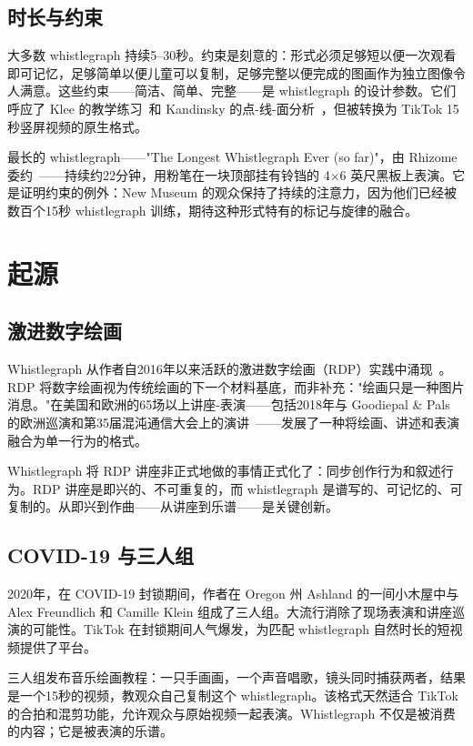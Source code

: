 \documentclass[10pt,letterpaper,twocolumn]{article}
\begin{document}
\subsection{时长与约束}

大多数 whistlegraph 持续5--30秒。约束是刻意的：形式必须足够短以便一次观看即可记忆，足够简单以便儿童可以复制，足够完整以便完成的图画作为独立图像令人满意。这些约束——简洁、简单、完整——是 whistlegraph 的设计参数。它们呼应了 Klee 的教学练习~\citep{klee1925pedagogical}和 Kandinsky 的点-线-面分析~\citep{kandinsky1926point}，但被转换为 TikTok 15秒竖屏视频的原生格式。

最长的 whistlegraph——"The Longest Whistlegraph Ever (so far)"，由 Rhizome 委约~\citep{rhizome2022longest}——持续约22分钟，用粉笔在一块顶部挂有铃铛的 4$\times$6 英尺黑板上表演。它是证明约束的例外：New Museum 的观众保持了持续的注意力，因为他们已经被数百个15秒 whistlegraph 训练，期待这种形式特有的标记与旋律的融合。

\section{起源}

\subsection{激进数字绘画}

Whistlegraph 从作者自2016年以来活跃的激进数字绘画（RDP）实践中涌现~\citep{scudder2017manifesto}。RDP 将数字绘画视为传统绘画的下一个材料基底，而非补充："绘画只是一种图片消息。"在美国和欧洲的65场以上讲座-表演——包括2018年与 Goodiepal \& Pals 的欧洲巡演和第35届混沌通信大会上的演讲~\citep{scudder2018rdp35c3}——发展了一种将绘画、讲述和表演融合为单一行为的格式。

Whistlegraph 将 RDP 讲座非正式地做的事情正式化了：同步创作行为和叙述行为。RDP 讲座是即兴的、不可重复的，而 whistlegraph 是谱写的、可记忆的、可复制的。从即兴到作曲——从讲座到乐谱——是关键创新。

\subsection{COVID-19 与三人组}

2020年，在 COVID-19 封锁期间，作者在 Oregon 州 Ashland 的一间小木屋中与 Alex Freundlich 和 Camille Klein 组成了三人组。大流行消除了现场表演和讲座巡演的可能性。TikTok 在封锁期间人气爆发，为匹配 whistlegraph 自然时长的短视频提供了平台。

三人组发布音乐绘画教程：一只手画画，一个声音唱歌，镜头同时捕获两者，结果是一个15秒的视频，教观众自己复制这个 whistlegraph。该格式天然适合 TikTok 的合拍和混剪功能，允许观众与原始视频一起表演。Whistlegraph 不仅是被消费的内容；它是被表演的乐谱。
\end{document}
